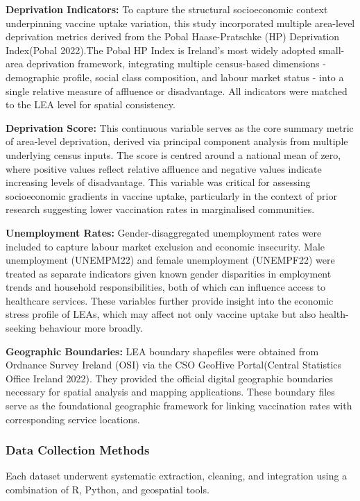 \documentclass{article}
\begin{document}
\textbf{Deprivation Indicators:} To capture the structural socioeconomic
context underpinning vaccine uptake variation, this study incorporated
multiple area-level deprivation metrics derived from the Pobal
Haase-Pratschke (HP) Deprivation Index(Pobal 2022).The Pobal HP Index is
Ireland's most widely adopted small-area deprivation framework,
integrating multiple census-based dimensions - demographic profile,
social class composition, and labour market status - into a single
relative measure of affluence or disadvantage. All indicators were
matched to the LEA level for spatial consistency.

\textbf{Deprivation Score:} This continuous variable serves as the core
summary metric of area-level deprivation, derived via principal
component analysis from multiple underlying census inputs. The score is
centred around a national mean of zero, where positive values reflect
relative affluence and negative values indicate increasing levels of
disadvantage. This variable was critical for assessing socioeconomic
gradients in vaccine uptake, particularly in the context of prior
research suggesting lower vaccination rates in marginalised communities.

\textbf{Unemployment Rates:} Gender-disaggregated unemployment rates
were included to capture labour market exclusion and economic
insecurity. Male unemployment (UNEMPM22) and female unemployment
(UNEMPF22) were treated as separate indicators given known gender
disparities in employment trends and household responsibilities, both of
which can influence access to healthcare services. These variables
further provide insight into the economic stress profile of LEAs, which
may affect not only vaccine uptake but also health-seeking behaviour
more broadly.

\textbf{Geographic Boundaries:} LEA boundary shapefiles were obtained
from Ordnance Survey Ireland (OSI) via the CSO GeoHive Portal(Central
Statistics Office Ireland 2022). They provided the official digital
geographic boundaries necessary for spatial analysis and mapping
applications. These boundary files serve as the foundational geographic
framework for linking vaccination rates with corresponding service
locations.

\subsubsection{Data Collection Methods}\label{data-collection-methods}

Each dataset underwent systematic extraction, cleaning, and integration
using a combination of R, Python, and geospatial tools.
\end{document}
